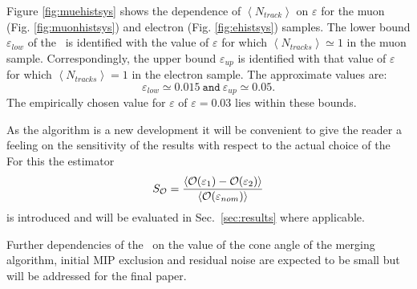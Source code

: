 Figure \ref{fig:muehistsys} shows the dependence of $\left<N_{track}\right>$ on $\varepsilon$ for the muon (Fig. \ref{fig:muonhistsys}) and electron (Fig. \ref{fig:ehistsys}) samples. 
The lower bound $\varepsilon_{low}$ of the \ep\ is identified with the value of $\varepsilon$ for which $\left<N_{tracks}\right> \simeq 1$ in the muon sample. Correspondingly, the upper bound $\varepsilon_{up}$ is identified with that value of $\varepsilon$ for which $\left<N_{tracks}\right> = 1$ in the electron sample.
The approximate values are:
\begin{equation}
\varepsilon_{low} \simeq 0.015\ \texttt{and}\ \varepsilon_{up} \simeq 0.05.
\end{equation}
The empirically chosen value for $\varepsilon$ of $\varepsilon = 0.03$ lies within these bounds. 

As the algorithm is a new development it will be convenient to give the reader a feeling on the sensitivity of the results with respect to the actual choice of the \ep\,
For this the estimator 
\begin{equation}
S_{{\cal O}} = \frac {\left<{\cal O}(\varepsilon_{1}) - {\cal O}(\varepsilon_{2})\right>}  {\left<{\cal O}(\varepsilon_{nom})\right>}
\label{eq:sens}
\end{equation}
is introduced and will be evaluated in Sec.~\ref{sec:results} where applicable.

Further dependencies of the \tfa\ on the value of the cone angle of the merging algorithm, initial MIP exclusion and residual noise are expected to be small but will be addressed for the final paper.


